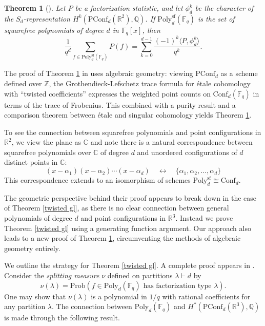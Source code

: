\documentclass[submission]{FPSAC2018}
\newtheorem{thm}{Theorem}[section]
\theoremstyle{definition}
\numberwithin{equation}{section}
\def\ZZ{\mathbb{Z}}
\def\QQ{\mathbb{Q}}
\def\FF{\mathbb{F}}
\def\CC{\mathbb{C}}
\def\RR{\mathbb{R}}
\def\Conf{\mathrm{Conf}}
\newcommand\PConf{\mathrm{PConf}}
\newcommand{\poly}{\mathrm{Poly}}
\newcommand{\sfr}{\mathrm{sf}}
\begin{document}
\begin{thm}[{\cite[Prop. 4.1]{CEF}}]
\label{twisted gl sf}
Let $P$ be a factorization statistic, and let $\phi_d^k$ be the character of the $S_d$-representation $H^k(\PConf_d(\RR^2), \QQ)$. If $\poly_d^\sfr(\FF_q)$ is the set of squarefree polynomials of degree $d$ in $\FF_q[x]$, then
\[
    \frac{1}{q^d}\sum_{f\in \poly_d^\sfr(\FF_q)}P(f) = \sum_{k=0}^{d-1}\frac{(-1)^k \langle P, \phi_d^k \rangle}{q^k}.
\]
\end{thm}

The proof of Theorem \ref{twisted gl sf} in \cite{CEF} uses algebraic geometry: viewing $\PConf_d$ as a scheme defined over $\ZZ$, the Grothendieck-Lefschetz trace formula for \'{e}tale cohomology with ``twisted coefficients'' expresses the weighted point counts on $\Conf_d(\FF_q)$ in terms of the trace of Frobenius. This combined with a purity result and a comparison theorem between \'{e}tale and singular cohomology yields Theorem \ref{twisted gl sf}.

To see the connection between squarefree polynomials and point configurations in $\RR^2$, we view the plane as $\CC$ and note there is a natural correspondence between squarefree polynomials over $\CC$ of degree $d$ and unordered configurations of $d$ distinct points in $\CC$: 
\[
    (x - \alpha_1)(x - \alpha_2)\cdots(x - \alpha_d)\hspace{1em} \longleftrightarrow \hspace{1em} \{\alpha_1, \alpha_2, \ldots, \alpha_d\}
\]
This correspondence extends to an isomorphism of schemes $\poly_d^\sfr \cong \Conf_d$.

The geometric perspective behind their proof appears to break down in the case of Theorem \ref{twisted gl}, as there is no clear connection between general polynomials of degree $d$ and point configurations in $\RR^3$. Instead we prove Theorem \ref{twisted gl} using a generating function argument. Our approach also leads to a new proof of Theorem \ref{twisted gl sf}, circumventing the methods of algebraic geometry entirely.

We outline the strategy for Theorem \ref{twisted gl}. A complete proof appears in \cite{Hyde1}. Consider the \emph{splitting measure} $\nu$ defined on partitions $\lambda \vdash d$ by
\[
    \nu(\lambda) = \mathrm{Prob}(f\in \poly_d(\FF_q) \text{ has factorization type $\lambda$}).
\]
One may show that $\nu(\lambda)$ is a polynomial in $1/q$ with rational coefficients for any partition $\lambda$. The connection between $\poly_d(\FF_q)$ and $H^{\ast}(\PConf_d(\RR^3),\QQ)$ is made through the following result.
\end{document}
